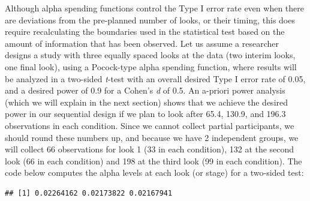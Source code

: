 \documentclass[
  oneside]{book}
\newenvironment{Shaded}{\begin{snugshade}}{\end{snugshade}}
\newcommand{\AttributeTok}[1]{\textcolor[rgb]{0.77,0.63,0.00}{#1}}
\newcommand{\DecValTok}[1]{\textcolor[rgb]{0.00,0.00,0.81}{#1}}
\newcommand{\FloatTok}[1]{\textcolor[rgb]{0.00,0.00,0.81}{#1}}
\newcommand{\FunctionTok}[1]{\textcolor[rgb]{0.00,0.00,0.00}{#1}}
\newcommand{\NormalTok}[1]{#1}
\newcommand{\OtherTok}[1]{\textcolor[rgb]{0.56,0.35,0.01}{#1}}
\newcommand{\SpecialCharTok}[1]{\textcolor[rgb]{0.00,0.00,0.00}{#1}}
\newcommand{\StringTok}[1]{\textcolor[rgb]{0.31,0.60,0.02}{#1}}
\begin{document}
Although alpha spending functions control the Type I error rate even when there are deviations from the pre-planned number of looks, or their timing, this does require recalculating the boundaries used in the statistical test based on the amount of information that has been observed. Let us assume a researcher designs a study with three equally spaced looks at the data (two interim looks, one final look), using a Pocock-type alpha spending function, where results will be analyzed in a two-sided \emph{t}-test with an overall desired Type I error rate of 0.05, and a desired power of 0.9 for a Cohen's \emph{d} of 0.5. An a-priori power analysis (which we will explain in the next section) shows that we achieve the desired power in our sequential design if we plan to look after 65.4, 130.9, and 196.3 observations in each condition. Since we cannot collect partial participants, we should round these numbers up, and because we have 2 independent groups, we will collect 66 observations for look 1 (33 in each condition), 132 at the second look (66 in each condition) and 198 at the third look (99 in each condition). The code below computes the alpha levels at each look (or stage) for a two-sided test:

\begin{Shaded}
\end{Shaded}

\begin{verbatim}
## [1] 0.02264162 0.02173822 0.02167941
\end{verbatim}
\end{document}

